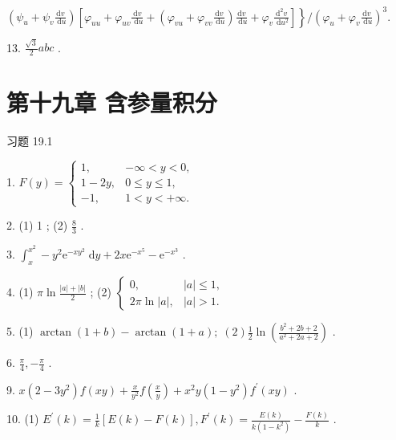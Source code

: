 \(\left. {\left( {{\psi }_{u} + {\psi }_{v}\frac{\mathrm{d}v}{\mathrm{\;d}u}}\right) \left\lbrack  {{\varphi }_{uu} + {\varphi }_{uv}\frac{\mathrm{d}v}{\mathrm{\;d}u} + \left( {{\varphi }_{vu} + {\varphi }_{vv}\frac{\mathrm{d}v}{\mathrm{\;d}u}}\right) \frac{\mathrm{d}v}{\mathrm{\;d}u} + {\varphi }_{v}\frac{{\mathrm{d}}^{2}v}{\mathrm{\;d}{u}^{2}}}\right\rbrack  }\right\}  /{\left( {\varphi }_{u} + {\varphi }_{v}\frac{\mathrm{d}v}{\mathrm{\;d}u}\right) }^{3}.\)

13. \(\frac{\sqrt{3}}{2}{abc}\) .

\section{第十九章 含参量积分}

习题 19.1

1. \(F\left( y\right)  = \left\{  \begin{array}{ll} 1, &  - \infty  < y < 0, \\  1 - {2y}, & 0 \leq  y \leq  1, \\   - 1, & 1 < y <  + \infty . \end{array}\right.\)

2. (1) 1 ; (2) \(\frac{8}{3}\) .

3. \({\int }_{x}^{{x}^{2}} - {y}^{2}{\mathrm{e}}^{-x{y}^{2}}\mathrm{\;d}y + {2x}{\mathrm{e}}^{-{x}^{5}} - {\mathrm{e}}^{-{x}^{3}}\) .

4. (1) \(\pi \ln \frac{\left| a\right|  + \left| b\right| }{2}\) ; (2) \(\left\{  \begin{array}{ll} 0, & \left| a\right|  \leq  1, \\  {2\pi }\ln \left| a\right| , & \left| a\right|  > 1. \end{array}\right.\)

5. (1) \(\arctan \left( {1 + b}\right)  - \arctan \left( {1 + a}\right) ;\;\left( 2\right) \frac{1}{2}\ln \left( \frac{{b}^{2} + {2b} + 2}{{a}^{2} + {2a} + 2}\right)\) .

6. \(\frac{\pi }{4}, - \frac{\pi }{4}\) .

9. \(x\left( {2 - 3{y}^{2}}\right) f\left( {xy}\right)  + \frac{x}{{y}^{2}}f\left( \frac{x}{y}\right)  + {x}^{2}y\left( {1 - {y}^{2}}\right) {f}^{\prime }\left( {xy}\right)\) .

10. (1) \({E}^{\prime }\left( k\right)  = \frac{1}{k}\left\lbrack  {E\left( k\right)  - F\left( k\right) }\right\rbrack  ,{F}^{\prime }\left( k\right)  = \frac{E\left( k\right) }{k\left( {1 - {k}^{2}}\right) } - \frac{F\left( k\right) }{k}\) .

